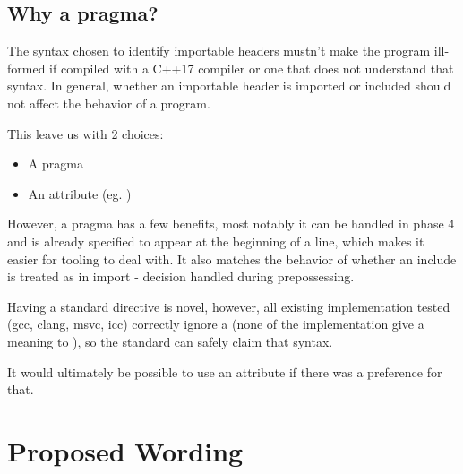 \documentclass{wg21}
\begin{document}
\subsection{Why a pragma?}

The syntax chosen to identify importable headers mustn't make the program ill-formed 
if compiled with a C++17 compiler or one that does not understand that syntax.
In general, whether an importable header is imported or included should not affect the behavior of a program.

This leave us with 2 choices:
\begin{itemize}
\item A pragma
\item An attribute (eg. \tcode{[[importable]]})
\end{itemize}

However, a pragma has a few benefits, most notably it can be handled in phase 4 and is already specified
to appear at the beginning of a line, which makes it easier for tooling to deal with.
It also matches the behavior of whether an include is treated as in import - decision handled during prepossessing.

Having a standard  directive is novel, however, all existing implementation tested (gcc, clang, msvc, icc)
correctly ignore a  (none of the implementation give a meaning to ), 
so the standard can safely claim that syntax.

It would ultimately be possible to use an attribute if there was a preference for that.


\section{Proposed Wording}
\end{document}
